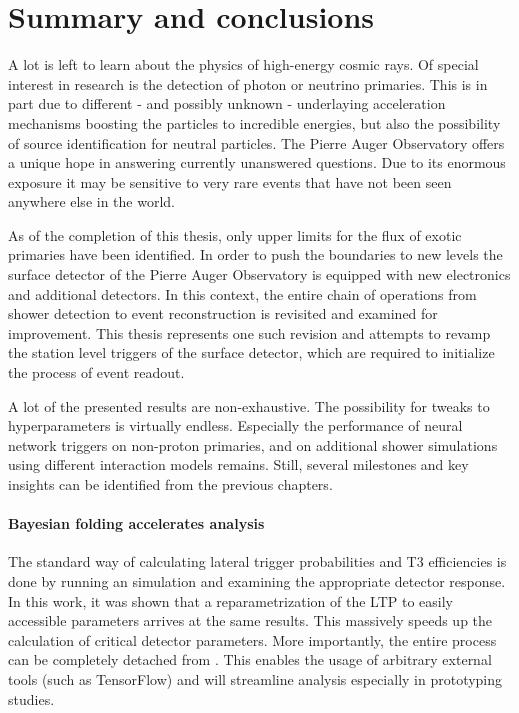 
\chapter{Summary and conclusions}
\label{chap:summary-and-conclusions}

A lot is left to learn about the physics of high-energy cosmic rays. Of special interest in research is the detection of photon or neutrino primaries. This is in 
part due to different - and possibly unknown - underlaying acceleration mechanisms boosting the particles to incredible energies, but also the possibility of 
source identification for neutral particles. The Pierre Auger Observatory offers a unique hope in answering currently unanswered questions. Due to its enormous 
exposure it may be sensitive to very rare events that have not been seen anywhere else in the world. 

As of the completion of this thesis, only upper limits for the flux of exotic primaries have been identified. In order to push the boundaries to new levels the 
surface detector of the Pierre Auger Observatory is equipped with new electronics and additional detectors. In this context, the entire chain of operations from 
shower detection to event reconstruction is revisited and examined for improvement. This thesis represents one such revision and attempts to revamp the station
level triggers of the surface detector, which are required to initialize the process of event readout. 

A lot of the presented results are non-exhaustive. The possibility for tweaks to hyperparameters is virtually endless. Especially the performance of neural network
triggers on non-proton primaries, and on additional shower simulations using different interaction models remains. Still, several milestones and key insights can 
be identified from the previous chapters.

\subsubsection{Bayesian folding accelerates analysis}

The standard way of calculating lateral trigger probabilities and T3 efficiencies is done by running an \Offline simulation and examining the appropriate detector 
response. In this work, it was shown that a reparametrization of the LTP to easily accessible parameters arrives at the same results. This massively speeds up 
the calculation of critical detector parameters. More importantly, the entire process can be completely detached from \Offline. This enables the usage of arbitrary
external tools (such as TensorFlow) and will streamline analysis especially in prototyping studies. 

